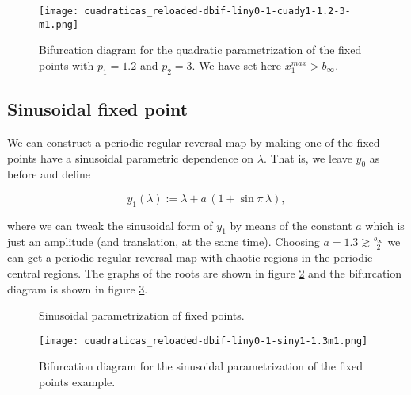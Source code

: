 \documentclass[10pt,twoside,titlepage]{book}
\numberwithin{equation}{chapter}
\numberwithin{figure}{chapter}
\numberwithin{table}{chapter}
\theoremstyle{plain}%
\theoremstyle{definition}
\theoremstyle{remark}
\begin{document}
\begin{figure}
	\centering
	\texttt{[image: cuadraticas\_reloaded-dbif-liny0-1-cuady1-1.2-3-m1.png]}
	\caption{Bifurcation diagram for the quadratic parametrization of the fixed points with $p_1=1.2$ and $p_2=3$. We have set here $x_1^{max}>b_{\infty}$.}
	\label{fig:dbif_liny0quady1c}
\end{figure}

\FloatBarrier

\subsection{Sinusoidal fixed point}
\label{ex:sinfp-CQM}

We can construct a periodic regular-reversal map by making one of the fixed points have a sinusoidal parametric dependence on $\lambda$. That is, we leave $y_0$ as before and define

\begin{equation}
	y_1(\lambda):= \lambda + a\,(1+\sin{\pi\,\lambda}),
	\label{eq:y1sinusoidal}
\end{equation}

where we can tweak the sinusoidal form of $y_1$ by means of the constant $a$ which is just an amplitude (and translation, at the same time). Choosing $a=1.3\gtrsim \frac{b_{\infty}}{2}$ we can get a periodic regular-reversal map with chaotic regions in the periodic central regions. The graphs of the roots are shown in figure \ref{fig:liny0siny1} and the bifurcation diagram is shown in figure \ref{fig:dbif_liny0siny1}.

\begin{figure}
	\centering
	\caption{Sinusoidal parametrization of fixed points.}
	\label{fig:liny0siny1}
\end{figure}

\begin{figure}
	\centering
	\texttt{[image: cuadraticas\_reloaded-dbif-liny0-1-siny1-1.3m1.png]}
	\caption{Bifurcation diagram for the sinusoidal parametrization of the fixed points example.}
	\label{fig:dbif_liny0siny1}
\end{figure}
\end{document}
